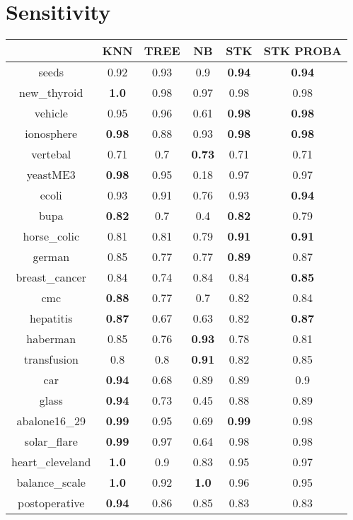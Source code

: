 \documentclass{article}%
\begin{document}
\section*{Sensitivity}%
\begin{tabular}{c|ccccc}%
&KNN&TREE&NB&STK&STK PROBA\\%
\hline%
seeds&0.92&0.93&0.9&\textbf{0.94}&\textbf{0.94}\\%
new\_thyroid&\textbf{1.0}&0.98&0.97&0.98&0.98\\%
vehicle&0.95&0.96&0.61&\textbf{0.98}&\textbf{0.98}\\%
ionosphere&\textbf{0.98}&0.88&0.93&\textbf{0.98}&\textbf{0.98}\\%
vertebal&0.71&0.7&\textbf{0.73}&0.71&0.71\\%
yeastME3&\textbf{0.98}&0.95&0.18&0.97&0.97\\%
ecoli&0.93&0.91&0.76&0.93&\textbf{0.94}\\%
bupa&\textbf{0.82}&0.7&0.4&\textbf{0.82}&0.79\\%
horse\_colic&0.81&0.81&0.79&\textbf{0.91}&\textbf{0.91}\\%
german&0.85&0.77&0.77&\textbf{0.89}&0.87\\%
breast\_cancer&0.84&0.74&0.84&0.84&\textbf{0.85}\\%
cmc&\textbf{0.88}&0.77&0.7&0.82&0.84\\%
hepatitis&\textbf{0.87}&0.67&0.63&0.82&\textbf{0.87}\\%
haberman&0.85&0.76&\textbf{0.93}&0.78&0.81\\%
transfusion&0.8&0.8&\textbf{0.91}&0.82&0.85\\%
car&\textbf{0.94}&0.68&0.89&0.89&0.9\\%
glass&\textbf{0.94}&0.73&0.45&0.88&0.89\\%
abalone16\_29&\textbf{0.99}&0.95&0.69&\textbf{0.99}&0.98\\%
solar\_flare&\textbf{0.99}&0.97&0.64&0.98&0.98\\%
heart\_cleveland&\textbf{1.0}&0.9&0.83&0.95&0.97\\%
balance\_scale&\textbf{1.0}&0.92&\textbf{1.0}&0.96&0.95\\%
postoperative&\textbf{0.94}&0.86&0.85&0.83&0.83\\%
\end{tabular}

%
\end{document}
